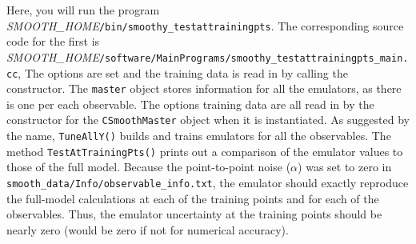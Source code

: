 \documentclass[UserManual.tex]{subfiles}
\begin{document}
\begin{sloppypar}
Here, you will run the program \textit{SMOOTH\_HOME}{\tt /bin/smoothy\_testattrainingpts}. The corresponding source code for the first is\\ \textit{SMOOTH\_HOME}{\tt /software/MainPrograms/smoothy\_testattrainingpts\_main.cc},
\vspace*{-8pt}
The options are set and the training data is read in by calling the constructor. The {\tt master} object stores information for all the emulators, as there is one per each observable. The options training data are all read in by the constructor for the {\tt CSmoothMaster} object when it is instantiated. As suggested by the name, {\tt TuneAllY()} builds and trains emulators for all the observables. The method {\tt TestAtTrainingPts()} prints out a comparison of the emulator values to those of the full model. Because the point-to-point noise ($\alpha$) was set to zero in {\tt smooth\_data/Info/observable\_info.txt}, the emulator should exactly reproduce the full-model calculations at each of the training points and for each of the observables. Thus, the emulator uncertainty at the training points should be nearly zero (would be zero if not for numerical accuracy).


\end{sloppypar}
\end{document}
